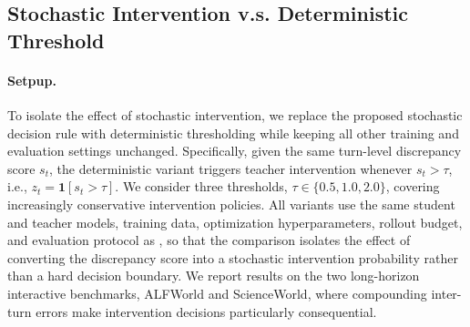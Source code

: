 \subsection{Stochastic Intervention v.s. Deterministic Threshold} \label{app:stochastic_vs_deterministic} 

\paragraph{Setpup. }
To isolate the effect of stochastic intervention, we replace the proposed stochastic decision rule with deterministic thresholding while keeping all other training and evaluation settings unchanged.
Specifically, given the same turn-level discrepancy score $s_t$, the deterministic variant triggers teacher intervention whenever $s_t>\tau$, i.e.,
$z_t=\mathbf{1}[s_t>\tau]$.
We consider three thresholds, $\tau\in\{0.5,1.0,2.0\}$, covering increasingly conservative intervention policies.
All variants use the same student and teacher models, training data, optimization hyperparameters, rollout budget, and evaluation protocol as \name, so that the comparison isolates the effect of converting the discrepancy score into a stochastic intervention probability rather than a hard decision boundary.
We report results on the two long-horizon interactive benchmarks, ALFWorld and ScienceWorld, where compounding inter-turn errors make intervention decisions particularly consequential. 

